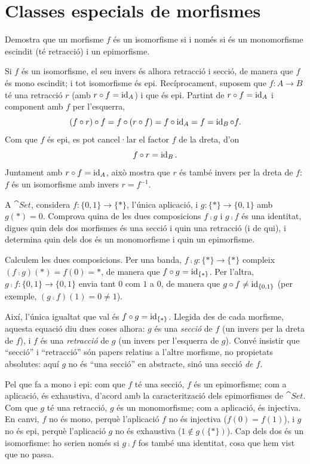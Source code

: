\section{Classes especials de morfismes}

\begin{exercici}
Demostra que un morfisme $f$ és un isomorfisme si i només si és un monomorfisme escindit (té retracció) i un epimorfisme.
\end{exercici}

\begin{solucio}
Si $f$ és un isomorfisme, el seu invers és alhora retracció i secció, de manera que $f$ és mono escindit; i tot isomorfisme és epi. Recíprocament, suposem que $f\colon A\to B$ té una retracció $r$ (amb $r\circ f=\operatorname{id}_A$) i que és epi. Partint de $r\circ f=\operatorname{id}_A$ i component amb $f$ per l'esquerra,
\[
(f\circ r)\circ f = f\circ(r\circ f) = f\circ\operatorname{id}_A = f = \operatorname{id}_B\circ f.
\]
Com que $f$ és epi, es pot cancel·lar el factor $f$ de la dreta, d'on
\[
f\circ r=\operatorname{id}_B.
\]
Juntament amb $r\circ f=\operatorname{id}_A$, això mostra que $r$ és també invers per la dreta de $f$: $f$ és un isomorfisme amb invers $r=f^{-1}$.
\end{solucio}

\begin{exercici}
A $\cat{Set}$, considera $f\colon\{0,1\}\to\{\ast\}$, l'única aplicació, i $g\colon\{\ast\}\to\{0,1\}$ amb $g(\ast)=0$. Comprova quina de les dues composicions $f\comp g$ i $g\comp f$ és una identitat, digues quin dels dos morfismes és una secció i quin una retracció (i de qui), i determina quin dels dos és un monomorfisme i quin un epimorfisme.
\end{exercici}

\begin{solucio}
Calculem les dues composicions. Per una banda, $f\comp g\colon\{\ast\}\to\{\ast\}$ compleix $(f\comp g)(\ast)=f(0)=\ast$, de manera que $f\circ g=\operatorname{id}_{\{\ast\}}$. Per l'altra, $g\comp f\colon\{0,1\}\to\{0,1\}$ envia tant $0$ com $1$ a $0$, de manera que $g\circ f\neq\operatorname{id}_{\{0,1\}}$ (per exemple, $(g\comp f)(1)=0\neq 1$).

Així, l'única igualtat que val és $f\circ g=\operatorname{id}_{\{\ast\}}$. Llegida des de cada morfisme, aquesta equació diu dues coses alhora: $g$ és una \emph{secció} de $f$ (un invers per la dreta de $f$), i $f$ és una \emph{retracció} de $g$ (un invers per l'esquerra de $g$). Convé insistir que \enquote{secció} i \enquote{retracció} són papers relatius a l'altre morfisme, no propietats absolutes: aquí $g$ no és \enquote{una secció} en abstracte, sinó una secció \emph{de $f$}.

Pel que fa a mono i epi: com que $f$ té una secció, $f$ és un epimorfisme; com a aplicació, és exhaustiva, d'acord amb la caracterització dels epimorfismes de $\cat{Set}$. Com que $g$ té una retracció, $g$ és un monomorfisme; com a aplicació, és injectiva. En canvi, $f$ no és mono, perquè l'aplicació $f$ no és injectiva ($f(0)=f(1)$), i $g$ no és epi, perquè l'aplicació $g$ no és exhaustiva ($1\notin g(\{\ast\})$). Cap dels dos és un isomorfisme: ho serien només si $g\comp f$ fos també una identitat, cosa que hem vist que no passa.
\end{solucio}

